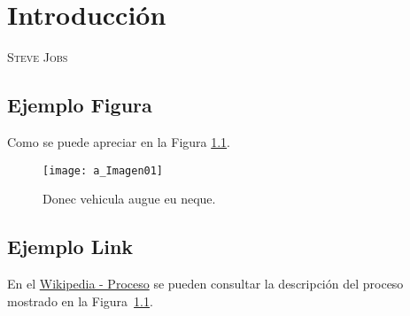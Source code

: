 \chapter{Introducción}
              {\textsc{Steve Jobs}}

\section{Ejemplo Figura}
\lipsum[1] 
Como se puede apreciar en la Figura \ref{fig:01_Proceso}.

\begin{figure}[htbp]                                                      %
\centering
\texttt{[image: a\_Imagen01]}
\caption{Donec vehicula augue eu neque.}
\label{fig:01_Proceso}
\end{figure}

\lipsum[2]


\section{Ejemplo Link}
\lipsum[3-4]
En el \href{https://es.wikipedia.org/wiki/Proceso_(ingenier%C3%ADa)}{Wikipedia - Proceso} se pueden consultar la descripción
del proceso mostrado en la Figura~\ref{fig:01_Proceso}. 
